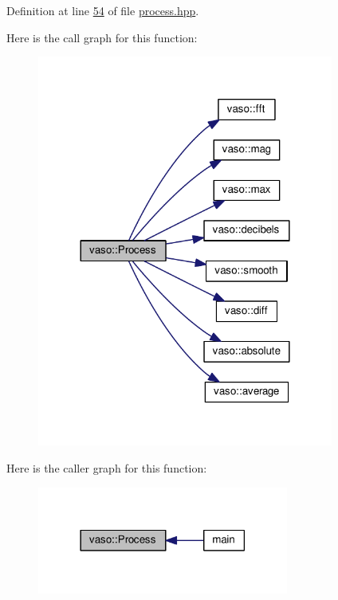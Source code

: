 Definition at line \hyperlink{process_8hpp_source_l00054}{54} of file \hyperlink{process_8hpp_source}{process.\+hpp}.



Here is the call graph for this function\+:
\nopagebreak
\begin{figure}[H]
\begin{center}
\leavevmode
\includegraphics[width=276pt]{namespacevaso_a0a7aa548b31b50c92be5b08bcb1df9a0_cgraph}
\end{center}
\end{figure}




Here is the caller graph for this function\+:
\nopagebreak
\begin{figure}[H]
\begin{center}
\leavevmode
\includegraphics[width=234pt]{namespacevaso_a0a7aa548b31b50c92be5b08bcb1df9a0_icgraph}
\end{center}
\end{figure}


